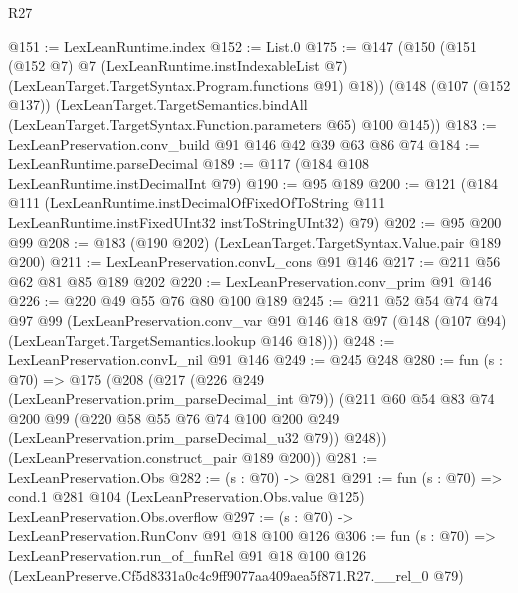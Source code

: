 \begin{lexlean}{R27}
\begin{coremodule}
@151 := LexLeanRuntime.index
@152 := List.{0}
@175 := @147
    (@150
      (@151
        (@152 @7)
        @7
        (LexLeanRuntime.instIndexableList @7)
        (LexLeanTarget.TargetSyntax.Program.functions @91)
        @18))
    (@148
      (@107 (@152 @137))
      (LexLeanTarget.TargetSemantics.bindAll
        (LexLeanTarget.TargetSyntax.Function.parameters @65)
        @100
        @145))
@183 := LexLeanPreservation.conv_build @91 @146 @42 @39 @63 @86 @74
@184 := LexLeanRuntime.parseDecimal
@189 := @117 (@184 @108 LexLeanRuntime.instDecimalInt @79)
@190 := @95 @189
@200 := @121
    (@184
      @111
      (LexLeanRuntime.instDecimalOfFixedOfToString
        @111
        LexLeanRuntime.instFixedUInt32
        instToStringUInt32)
      @79)
@202 := @95 @200 @99
@208 := @183 (@190 @202) (LexLeanTarget.TargetSyntax.Value.pair @189 @200)
@211 := LexLeanPreservation.convL_cons @91 @146
@217 := @211 @56 @62 @81 @85 @189 @202
@220 := LexLeanPreservation.conv_prim @91 @146
@226 := @220 @49 @55 @76 @80 @100 @189
@245 := @211
    @52
    @54
    @74
    @74
    @97
    @99
    (LexLeanPreservation.conv_var
      @91
      @146
      @18
      @97
      (@148 (@107 @94) (LexLeanTarget.TargetSemantics.lookup @146 @18)))
@248 := LexLeanPreservation.convL_nil @91 @146
@249 := @245 @248
@280 := fun (s : @70) =>
  @175
    (@208
      (@217
        (@226 @249 (LexLeanPreservation.prim_parseDecimal_int @79))
        (@211
          @60
          @54
          @83
          @74
          @200
          @99
          (@220 @58 @55 @76 @74 @100 @200 @249 (LexLeanPreservation.prim_parseDecimal_u32 @79))
          @248))
      (LexLeanPreservation.construct_pair @189 @200))
@281 := LexLeanPreservation.Obs
@282 := (s : @70) -> @281
@291 := fun (s : @70) =>
  cond.{1} @281 @104 (LexLeanPreservation.Obs.value @125) LexLeanPreservation.Obs.overflow
@297 := (s : @70) -> LexLeanPreservation.RunConv @91 @18 @100 @126
@306 := fun (s : @70) =>
  LexLeanPreservation.run_of_funRel
    @91
    @18
    @100
    @126
    (LexLeanPreserve.Cf5d8331a0c4c9ff9077aa409aea5f871.R27.__rel_0 @79)
\end{coremodule}
\end{lexlean}

